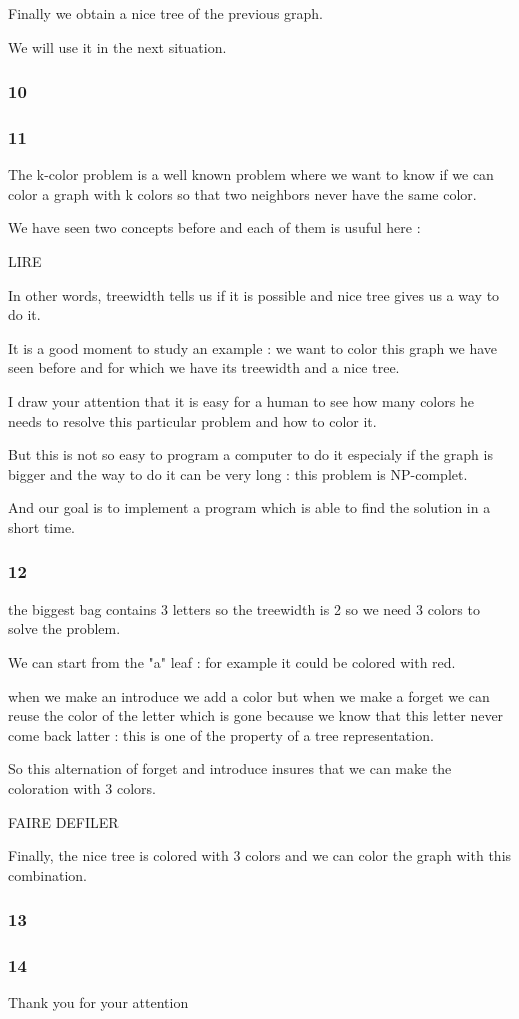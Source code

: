 \documentclass[a4paper, 11pt,french]{article}
\begin{document}
Finally we obtain a nice tree of the previous graph. 

We will use it in the next situation.



\subsubsection*{ 10}


\subsubsection*{ 11}

The k-color problem is a well known problem where we want to know if we can color a graph with k colors so that two neighbors never have the same color.

We have seen two concepts before and each of them is usuful here : 

LIRE

In other words, treewidth tells us if it is possible and nice tree gives us a way to do it.

It is a good moment to study an example : we want to color this graph we have seen before and for which we have its treewidth and a nice tree.

I draw your attention that it is easy for a human to see how many colors he needs to resolve this particular problem and how to color it. 

But this is not so easy to program a computer to do it especialy if the graph is bigger and the way to do it can be very long : this problem is NP-complet.

 And our goal is to implement a program which is able to find the solution in a short time.

\subsubsection*{ 12}

the biggest bag contains 3 letters so the treewidth is 2 so we need 3 colors to solve the problem.

We can start from the "a" leaf : for example it could be colored with red.

when we make an introduce we add a color but when we make a forget we can reuse the color of the letter which is gone because we know that this letter never come back latter : this is one of the property of a tree representation.

So this alternation of forget and introduce insures that we can make the coloration with 3 colors.

FAIRE DEFILER 

Finally, the nice tree is colored with 3 colors and we can color the graph with this combination.



\subsubsection*{ 13}


\subsubsection*{ 14}


Thank you for your attention
\end{document}
